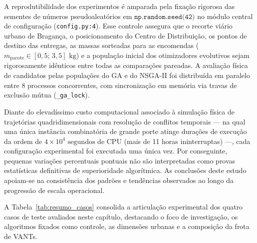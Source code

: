 A reprodutibilidade dos experimentos é amparada pela fixação rigorosa das sementes de números pseudoaleatórios em $\texttt{np.random.seed(42)}$ no módulo central de configuração (\texttt{config.py:4}). Esse controle assegura que o recorte viário urbano de Bragança, o posicionamento do Centro de Distribuição, os pontos de destino das entregas, as massas sorteadas para as encomendas ($m_{\text{pacote}} \in [0{,}5;\,3{,}5]\text{ kg}$) e a população inicial dos otimizadores evolutivos sejam rigorosamente idênticos entre todas as comparações pareadas. A avaliação física de candidatos pelas populações do GA e do NSGA-II foi distribuída em paralelo entre 8 processos concorrentes, com sincronização em memória via travas de exclusão mútua (\texttt{\_ga\_lock}).

Diante do elevadíssimo custo computacional associado à simulação física de trajetórias quadridimensionais com resolução de conflitos temporais — na qual uma única instância combinatória de grande porte atinge durações de execução da ordem de $4 \times 10^4\text{ segundos}$ de CPU (mais de 11 horas ininterruptas) —, cada configuração experimental foi executada uma única vez. Por conseguinte, pequenas variações percentuais pontuais não são interpretadas como provas estatísticas definitivas de superioridade algorítmica. As conclusões deste estudo apoiam-se na consistência dos padrões e tendências observados ao longo da progressão de escala operacional.

A Tabela~\ref{tab:resumo_casos} consolida a articulação experimental dos quatro casos de teste avaliados neste capítulo, destacando o foco de investigação, os algoritmos fixados como controle, as dimensões urbanas e a composição da frota de VANTs.

